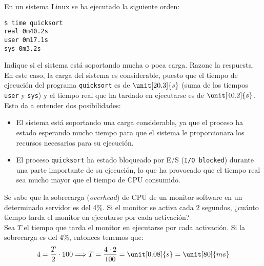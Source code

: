\begin{ejercicio}
    En un sistema Linux se ha ejecutado la siguiente orden:
    \begin{verbatim}
$ time quicksort
real 0m40.2s
user 0m17.1s
sys 0m3.2s
    \end{verbatim}

    Indique si el sistema está soportando mucha o poca carga. Razone la respuesta.\\

    En este caso, la carga del sistema es considerable, puesto que el tiempo de ejecución del programa \verb|quicksort| es de $\unit[20.3]{s}$ (suma de los tiempos \verb|user| y \verb|sys|) y el tiempo real que ha tardado en ejecutarse es de $\unit[40.2]{s}$. Esto da a entender dos posibilidades:
    \begin{itemize}
        \item El sistema está soportando una carga considerable, ya que el proceso ha estado esperando mucho tiempo para que el sistema le proporcionara los recursos necesarios para su ejecución.
        \item El proceso \verb|quicksort| ha estado bloqueado por E/S (\verb|I/O blocked|) durante una parte importante de su ejecución, lo que ha provocado que el tiempo real sea mucho mayor que el tiempo de CPU consumido.
    \end{itemize}
\end{ejercicio}
\begin{comment}
    Solución: Parece que se trata de un sistema con una carga considerable, ya que hay una notable diferencia entre el tiempo de respuesta que experimenta el usuario (parámetro real) y el tiempo que realmente tarda en ejecutarse su programa (suma de los parámetros user y sys). También podría ser que el proceso \verb|quicksort| usara mucha E/S y que estuviera buena parte del tiempo bloqueado por E/S (I/O blocked).
\end{comment}

\begin{ejercicio}
    Se sabe que la sobrecarga (\emph{overhead}) de CPU de un monitor software en un determinado servidor es del 4\%. Si el monitor se activa cada 2 segundos, ¿cuánto tiempo tarda el monitor en ejecutarse por cada activación?\\

    Sea $T$ el tiempo que tarda el monitor en ejecutarse por cada activación. Si la sobrecarga es del 4\%, entonces tenemos que:
    \begin{align*}
        4 = \frac{T}{2} \cdot 100
        \Longrightarrow T = \frac{4 \cdot 2}{100} = \unit[0.08]{s} = \unit[80]{ms}
    \end{align*}
\end{ejercicio}
\begin{comment}
    Solución: El monitor tarda en ejecutarse 80 milisegundos por activación.
\end{comment}

